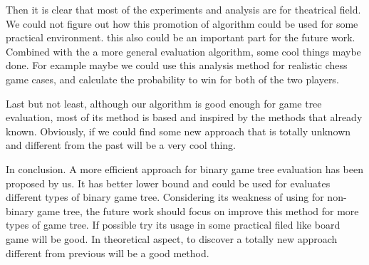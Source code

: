 Then it is clear that most of the experiments and analysis are for theatrical field. We could not figure out how this promotion of algorithm could be used for some practical environment. this also could be an important part for the future work. Combined with the a more general evaluation algorithm, some cool things maybe done. For example maybe we could use this analysis method for realistic chess game cases, and calculate the probability to win for both of the two players.

Last but not least, although our algorithm is good enough for game tree evaluation, most of its method is based and inspired by the methods that already known. Obviously, if we could find some new approach that is totally unknown and different from the past will be a very cool thing. 

In conclusion. A more efficient approach for binary game tree evaluation has been proposed by us. It has better lower bound and could be used for evaluates different types of binary game tree. Considering its weakness of using for non-binary game tree, the future work should focus on improve this method for more types of game tree. If possible try its usage in some practical filed like board game will be good. In theoretical aspect, to discover a totally new approach different from previous will be a good method.

